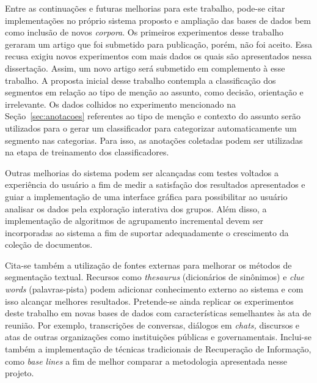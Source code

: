 Entre as continuações e futuras melhorias para este trabalho, pode-se citar implementações no próprio sistema proposto e ampliação das bases de dados bem como inclusão de novos \textit{corpora}.  
%
Os primeiros experimentos desse trabalho geraram um artigo que foi submetido para publicação, porém, não foi aceito. Essa recusa exigiu novos experimentos com mais dados os quais são apresentados nessa dissertação. Assim, um novo artigo será submetido em complemento à esse trabalho.
% 
A proposta inicial desse trabalho contempla a classificação dos segmentos em relação ao tipo de menção ao assunto, como decisão, orientação e irrelevante. Os dados colhidos no experimento mencionado na Seção~\ref{sec:anotacoes} referentes ao tipo de menção e contexto do assunto serão utilizados para o gerar um classificador para categorizar automaticamente um segmento nas categorias. Para isso, as anotações coletadas podem ser utilizadas na etapa de treinamento dos classificadores.

%
Outras melhorias do sistema podem ser alcançadas com testes voltados a experiência do usuário a fim de medir a satisfação dos resultados apresentados e guiar a implementação de uma interface gráfica para possibilitar ao usuário analisar os dados pela exploração interativa dos grupos. Além disso, a implementação de algoritmos de agrupamento incremental devem ser incorporadas ao sistema a fim de suportar adequadamente o crescimento da coleção de documentos.
%

Cita-se também a utilização de fontes externas para melhorar os métodos de segmentação textual. Recursos como \textit{thesaurus} (dicionários de sinônimos) e \textit{clue words} (palavras-pista) podem adicionar conhecimento externo ao sistema e com isso alcançar melhores resultados. 
%
Pretende-se ainda replicar os experimentos deste trabalho em novas bases de dados com características semelhantes às ata de reunião. Por exemplo, transcrições de conversas, diálogos em \textit{chats,} discursos e atas de outras organizações como instituições públicas e governamentais.  
Inclui-se também a implementação de técnicas tradicionais de Recuperação de Informação, como \textit{base lines} a fim de melhor comparar a metodologia apresentada nesse projeto. 




















